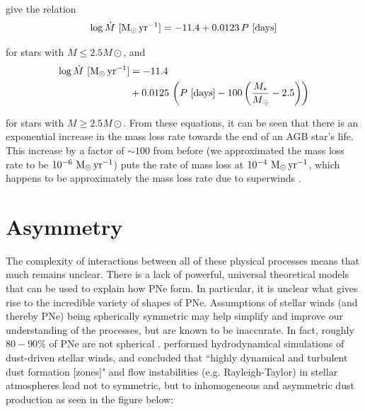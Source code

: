 \documentclass[twocolumn]{aastex63}
\begin{document}
\cite{vassiliadis} give the relation 
\begin{align*}
    \log \dot M~{[\rm M_\odot\,yr^{-1}]} = -11.4 + 0.0123\,P~{[\rm days]}
\end{align*}

for stars with $M\leq 2.5M\odot$, and
\begin{align*}
    \log \dot M~{[\rm M_\odot\,yr^{-1}]} &= -11.4 \\
                                         &+ 0.0125\,\left(P~{[\rm days]} - 100\left(\frac{M_*}{M_\odot} - 2.5\right)\right)
\end{align*}

for stars with $M\geq 2.5M\odot$. From these equations, it can be seen that there is an exponential increase in the mass loss rate towards the end of an AGB star's life. This increase by a factor of $\sim 100$ from before (we approximated the mass loss rate to be $10^{-6}~{\rm M_\odot\,yr^{-1}}$) puts the rate of mass loss at  $10^{-4}~{\rm M_\odot\,yr^{-1}}$, which happens to be approximately the mass loss rate due to superwinds \citep{iben}. 

\vfill\null 
\columnbreak
\section{Asymmetry}\label{sec:asymmetry}

The complexity of interactions between all of these physical processes means that much remains unclear. There is a lack of powerful, universal theoretical models that can be used to explain how PNe form. In particular, it is unclear what gives rise to the incredible variety of shapes of PNe. Assumptions of stellar winds (and thereby PNe) being spherically symmetric may help simplify and improve our understanding of the processes, but are known to be inaccurate. In fact, roughly $80-90\%$ of PNe are not spherical \citep{demarco, soker1997}. \cite{woitke} performed hydrodynamical simulations of dust-driven stellar winds, and concluded that ``highly dynamical and turbulent dust formation [zones]" and flow instabilities (e.g. Rayleigh-Taylor) in stellar atmospheres lead not to symmetric, but to inhomogeneous and asymmetric dust production as seen in the figure below:
\end{document}
